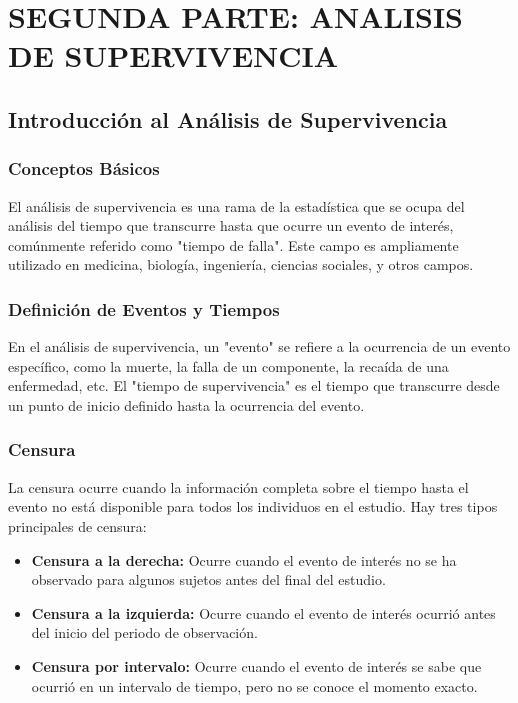 \documentclass[a4paper]{report} %
\begin{document}
\part{SEGUNDA PARTE: ANALISIS DE SUPERVIVENCIA}

\chapter{Introducción al Análisis de Supervivencia}

\section{Conceptos Básicos}
El análisis de supervivencia es una rama de la estad\'istica que se ocupa del análisis del tiempo que transcurre hasta que ocurre un evento de inter\'es, com\'unmente referido como "tiempo de falla". Este campo es ampliamente utilizado en medicina, biolog\'ia, ingenier\'ia, ciencias sociales, y otros campos.

\section{Definici\'on de Eventos y Tiempos}
En el análisis de supervivencia, un "evento" se refiere a la ocurrencia de un evento espec\'ifico, como la muerte, la falla de un componente, la reca\'ida de una enfermedad, etc. El "tiempo de supervivencia" es el tiempo que transcurre desde un punto de inicio definido hasta la ocurrencia del evento.

\section{Censura}
La censura ocurre cuando la informaci\'on completa sobre el tiempo hasta el evento no está disponible para todos los individuos en el estudio. Hay tres tipos principales de censura:
\begin{itemize}
    \item \textbf{Censura a la derecha:} Ocurre cuando el evento de inter\'es no se ha observado para algunos sujetos antes del final del estudio.
    \item \textbf{Censura a la izquierda:} Ocurre cuando el evento de inter\'es ocurri\'o antes del inicio del periodo de observaci\'on.
    \item \textbf{Censura por intervalo:} Ocurre cuando el evento de inter\'es se sabe que ocurri\'o en un intervalo de tiempo, pero no se conoce el momento exacto.
\end{itemize}
\end{document}
